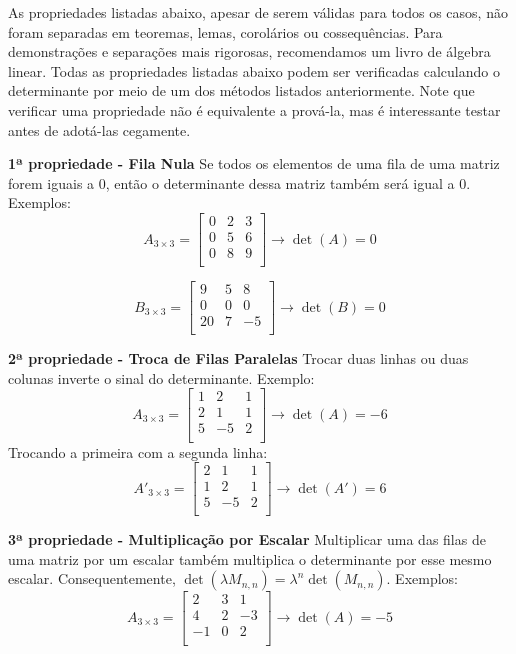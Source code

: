 \documentclass[
  portuguese,
  letterpaper,
  DIV=11,
  numbers=noendperiod]{scrreport}
\begin{document}
As propriedades listadas abaixo, apesar de serem válidas para todos os
casos, não foram separadas em teoremas, lemas, corolários ou
cossequências. Para demonstrações e separações mais rigorosas,
recomendamos um livro de álgebra linear. Todas as propriedades listadas
abaixo podem ser verificadas calculando o determinante por meio de um
dos métodos listados anteriormente. Note que verificar uma propriedade
não é equivalente a prová-la, mas é interessante testar antes de
adotá-las cegamente.

\textbf{1ª propriedade - Fila Nula} Se todos os elementos de uma fila de
uma matriz forem iguais a \(0\), então o determinante dessa matriz
também será igual a \(0\). Exemplos: \[
A_{3\times3} =
\begin{bmatrix}
    0 & 2 & 3\\
    0 & 5 & 6\\
    0 & 8 & 9 \\
\end{bmatrix}
\rightarrow \det(A) = 0
\]

\[
B_{3\times3} =
\begin{bmatrix}
    9 & 5 & 8\\
    0 & 0 & 0\\
    20 & 7 & -5 \\
\end{bmatrix}
\rightarrow \det(B) = 0
\]

\textbf{2ª propriedade - Troca de Filas Paralelas} Trocar duas linhas ou
duas colunas inverte o sinal do determinante. Exemplo: \[
A_{3\times3} =
\begin{bmatrix}
    1 & 2 & 1\\
    2 & 1 & 1\\
    5 & -5 & 2 \\
\end{bmatrix}
\rightarrow \det(A) = -6
\] Trocando a primeira com a segunda linha: \[
A'_{3\times3} =
\begin{bmatrix}
    2 & 1 & 1\\
    1 & 2 & 1\\
    5 & -5 & 2 \\
\end{bmatrix}
\rightarrow \det(A') = 6
\]

\textbf{3ª propriedade - Multiplicação por Escalar} Multiplicar uma das
filas de uma matriz por um escalar também multiplica o determinante por
esse mesmo escalar. Consequentemente,
\(\det(\lambda M_{n,n}) = \lambda ^ n \det(M_{n,n})\). Exemplos: \[
A_{3\times3} =
\begin{bmatrix}
    2 & 3 & 1  \\
    4 & 2 & -3 \\
    -1 & 0 & 2 \\
\end{bmatrix}
\rightarrow \det(A) = -5
\]
\end{document}
